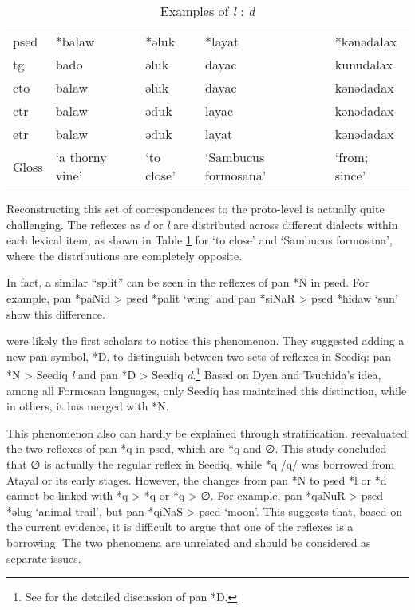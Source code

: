 \begin{table}[!htbp]
\centering
\caption{Examples of \textit{l} : \textit{d}}
\label{tab:irr_ld}
\begin{tabular}{lllll}
\hline
\acs{psed} & *balaw        & *əluk    & *layat             & *kənədalax    \\ \hdashline
\acs{tg}   & bado            & əluk       & dayac                & kunudalax     \\
\acs{cto}  & balaw           & əluk       & dayac                & kənədadax     \\
\acs{ctr}  & balaw           & əduk       & layac                & kənədadax     \\
\acs{etr}  & balaw           & əduk       & layat                & kənədadax     \\ \hline
Gloss      & `a thorny vine' & `to close' & `Sambucus formosana' & `from; since' \\ \hline
\end{tabular}
\end{table}

Reconstructing this set of correspondences to the proto-level is actually quite challenging. The reflexes as \textit{d} or \textit{l} are distributed across different dialects within each lexical item, as shown in Table \ref{tab:irr_ld} for `to close' and `Sambucus formosana', where the distributions are completely opposite. 

In fact, a similar ``split'' can be seen in the reflexes of \acl{pan} *N in \acl{psed}. For example, \acs{pan} *paNid > \acs{psed} *palit `wing' and \acs{pan} *siNaR > \acs{psed} *hidaw `sun' show this difference.

\textcite{dyen1987d5} were likely the first scholars to notice this phenomenon. They suggested adding a new \acs{pan} symbol, *D, to distinguish between two sets of reflexes in Seediq: \acs{pan} *N > Seediq \textit{l} and \acs{pan} *D > Seediq \textit{d}.\footnote{See \textcite{tsuchida1976tsouic} for the detailed discussion of \acs{pan} *D. } Based on Dyen and Tsuchida's idea, among all Formosan languages, only Seediq has maintained this distinction, while in others, it has merged with *N.

This phenomenon also can hardly be explained through stratification. \textcite{song2024sedq} reevaluated the two reflexes of \acl{pan} *q in \acl{psed}, which are *q and ∅. This study concluded that ∅ is actually the regular reflex in Seediq, while *q /q/ was borrowed from Atayal or its early stages. However, the changes from \ac{pan} *N to \ac{psed} *l or *d cannot be linked with *q > *q or *q > ∅. For example, \ac{pan} *qəNuR > \ac{psed} *əlug `animal trail’, but \ac{pan} *qiNaS > \ac{psed} `moon’. This suggests that, based on the current evidence, it is difficult to argue that one of the reflexes is a borrowing. The two phenomena are unrelated and should be considered as separate issues. 

